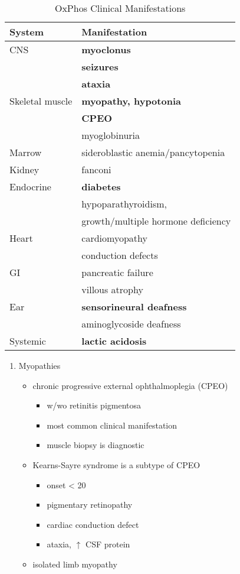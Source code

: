 \documentclass{scrartcl}
\begin{document}
\begin{enumerate}
\begin{table}[htbp]
\caption{\label{tab:orgb6f7d0f}
OxPhos Clinical Manifestations}
\centering
\begin{tabular}{ll}
System & Manifestation\\
\hline
CNS & \textbf{myoclonus}\\
 & \textbf{seizures}\\
 & \textbf{ataxia}\\
Skeletal muscle & \textbf{myopathy, hypotonia}\\
 & \textbf{CPEO}\\
 & myoglobinuria\\
Marrow & sideroblastic anemia/pancytopenia\\
Kidney & fanconi\\
Endocrine & \textbf{diabetes}\\
 & hypoparathyroidism,\\
 & growth/multiple hormone deficiency\\
Heart & cardiomyopathy\\
 & conduction defects\\
GI & pancreatic failure\\
 & villous atrophy\\
Ear & \textbf{sensorineural deafness}\\
 & aminoglycoside deafness\\
Systemic & \textbf{lactic acidosis}\\
\end{tabular}
\end{table}

\begin{enumerate}
\item Myopathies
\label{sec:org83c771d}
\begin{itemize}
\item chronic progressive external ophthalmoplegia (CPEO)
\begin{itemize}
\item w/wo retinitis pigmentosa
\item most common clinical manifestation
\item muscle biopsy is diagnostic
\end{itemize}
\item Kearns-Sayre syndrome is a subtype of CPEO
\begin{itemize}
\item onset \textless{} 20
\item pigmentary retinopathy
\item cardiac conduction defect
\item ataxia, \(\uparrow\) CSF protein
\end{itemize}
\item isolated limb myopathy
\end{itemize}


\end{enumerate}
\end{enumerate}
\end{document}
